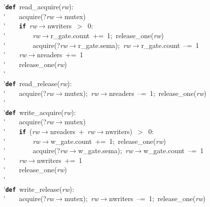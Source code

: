 \'\>\texttt{\textbf{def}}~read\_acquire(\textit{rw}):\\

\'\>~~~~acquire(?\textit{rw}$\rightarrow$mutex)\\

\'\>~~~~\texttt{\textbf{if}}~\textit{rw}$\rightarrow$nwriters~$>$~0:\\

\'\>~~~~~~~~\textit{rw}$\rightarrow$r\_gate.count~+=~1;~release\_one(\textit{rw})\\

\'\>~~~~~~~~acquire(?\textit{rw}$\rightarrow$r\_gate.sema);~\textit{rw}$\rightarrow$r\_gate.count~--=~1\\

\'\>~~~~\textit{rw}$\rightarrow$nreaders~+=~1\\

\'\>~~~~release\_one(\textit{rw})\\

\'\>\\

\'\>\texttt{\textbf{def}}~read\_release(\textit{rw}):\\

\'\>~~~~acquire(?\textit{rw}$\rightarrow$mutex);~\textit{rw}$\rightarrow$nreaders~--=~1;~release\_one(\textit{rw})\\

\'\>\\

\'\>\texttt{\textbf{def}}~write\_acquire(\textit{rw}):\\

\'\>~~~~acquire(?\textit{rw}$\rightarrow$mutex)\\

\'\>~~~~\texttt{\textbf{if}}~(\textit{rw}$\rightarrow$nreaders~+~\textit{rw}$\rightarrow$nwriters)~$>$~0:\\

\'\>~~~~~~~~\textit{rw}$\rightarrow$w\_gate.count~+=~1;~release\_one(\textit{rw})\\

\'\>~~~~~~~~acquire(?\textit{rw}$\rightarrow$w\_gate.sema);~\textit{rw}$\rightarrow$w\_gate.count~--=~1\\

\'\>~~~~\textit{rw}$\rightarrow$nwriters~+=~1\\

\'\>~~~~release\_one(\textit{rw})\\

\'\>\\

\'\>\texttt{\textbf{def}}~write\_release(\textit{rw}):\\

\'\>~~~~acquire(?\textit{rw}$\rightarrow$mutex);~\textit{rw}$\rightarrow$nwriters~--=~1;~release\_one(\textit{rw})